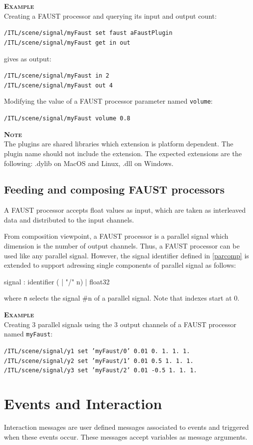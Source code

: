 \documentclass[a4paper,twoside]{report}
\newcommand{\toplevel}[1]	{\chapter{#1}}
\newcommand{\sublevel}[1]	{\section{#1}}
\newcommand{\OSC}[1]		{\texttt{#1}}
\newcommand{\values}[1]	{\texttt{#1}}
\newcommand{\example}		{\textbf{\hspace{-1.5cm}\textbf{\textsc{Example }}}}
\newcommand{\note}	[1]		{\vspace{2mm}\textbf{\hspace{-1.03cm}\textbf{\textsc{Note #1}}}}
\newcommand{\sample}	[1]			{\vspace{-2mm}\begin{center}\colorbox{mygrey}{
								\begin{minipage}[t]{0.9\columnwidth} 
								{\small \texttt{#1}}
								\end{minipage}}\end{center}}
\newcommand{\sampleindent}	{ \hspace{0.5cm} }
\begin{document}
\example \\
Creating a FAUST processor and querying its input and output count:
\sample{/ITL/scene/signal/myFaust set faust aFaustPlugin \\
/ITL/scene/signal/myFaust get in out
}
\sampleindent gives as output:
\sample{/ITL/scene/signal/myFaust in 2 \\
/ITL/scene/signal/myFaust out 4
}
Modifying the value of a FAUST processor parameter named \OSC{volume}:
\sample{/ITL/scene/signal/myFaust volume 0.8}

\note{} \\
The plugins are shared libraries which extension is platform dependent. The plugin name should not include the extension. The expected extensions are the following: .dylib on MacOS and Linux, .dll on Windows.

\sublevel{Feeding and composing FAUST processors}
\label{composefaust}

A FAUST processor accepts float values as input, which are taken as interleaved data and distributed to the input channels.

From composition viewpoint, a FAUST processor is a parallel signal which dimension is the number of output channels. 
Thus, a FAUST processor can be used like any parallel signal. However, the signal identifier defined in \ref{parcomp} is extended to support adressing single components of parallel signal as follows:
\begin{rail}
signal :  
		  identifier ( | "/" n)
		| float32
\end{rail}
where \values{n} selects the signal \#n of a parallel signal. Note that indexes start at 0.

\example \\
Creating 3 parallel signals using the 3 output channels of a FAUST processor named \OSC{myFaust}:
\sample{/ITL/scene/signal/y1 set 'myFaust/0' 0.01 0. 1. 1. 1. \\
/ITL/scene/signal/y2 set 'myFaust/1' 0.01 0.5 1. 1. 1. \\
/ITL/scene/signal/y3 set 'myFaust/2' 0.01 -0.5 1. 1. 1.
}

\toplevel{Events and Interaction}
\label{interaction}

Interaction messages are user defined messages associated to events and triggered when these events occur. These messages accept variables as message arguments.
\end{document}

